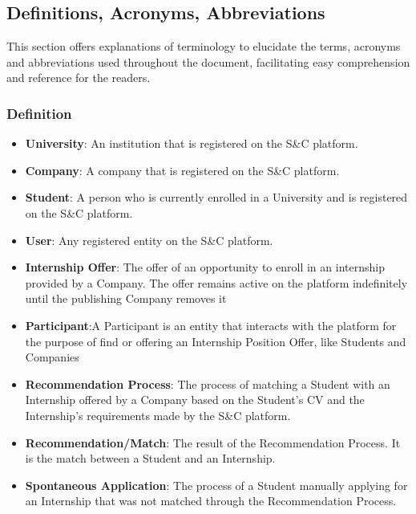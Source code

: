 \subsection{Definitions, Acronyms, Abbreviations} 
This section offers explanations of terminology to elucidate the terms, acronyms and abbreviations used throughout the document, facilitating easy comprehension and reference for the readers.
\subsubsection{Definition}
\begin{itemize}
    \item \textcolor{titleColor}{\textbf{University}\label{def:university}}: An institution that is registered on the S\&C platform.
    \item \textcolor{titleColor}{\textbf{Company}\label{def:company}}: A company that is registered on the S\&C platform.
    \item \textcolor{titleColor}{\textbf{Student}\label{def:student}}: A person who is currently enrolled in a University and is registered on the S\&C platform.
    \item \textcolor{titleColor}{\textbf{User}\label{def:user}}: Any registered entity on the S\&C platform.
    \item \textcolor{titleColor}{\textbf{Internship Offer}\label{def:internshipOffer}}: The offer of an opportunity to enroll in an internship provided by a Company. The offer remains active on the platform indefinitely until the publishing Company removes it
    \item \textcolor{titleColor}{\textbf{Participant}}\label{def:participant}:{A Participant is an entity that interacts with the platform for the purpose of find or offering an Internship Position Offer, like Students and Companies
    }
    \item \textcolor{titleColor}{\textbf{Recommendation Process}}\label{def:recommendationProcess}: The process of matching a Student with an Internship offered by a Company based on the Student's CV and the Internship's requirements made by the S\&C platform.
    \item \textcolor{titleColor}{\textbf{Recommendation/Match}\label{def:match}}: The result of the Recommendation Process. It is the match between a Student and an Internship.
    \item \textcolor{titleColor}{\textbf{Spontaneous Application}\label{def:spontaneousApplication}}: The process of a Student manually applying for an Internship that was not matched through the Recommendation Process.

\end{itemize}
